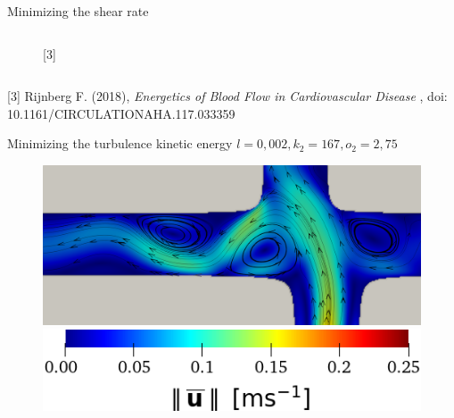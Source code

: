 \documentclass[aspectratio=169,xcolor=dvipsnames]{beamer}
\begin{document}
\begin{frame}{Minimizing the shear rate}
\begin{columns}
\begin{column}{.35\textwidth}
\begin{figure}
				\caption{[3]}		
			\end{figure}
		\end{column}
	\end{columns}	
	\vspace{-1mm}
	\tiny{[3] Rijnberg F. (2018), \textit{Energetics of Blood Flow in Cardiovascular
			Disease
		}, doi: 10.1161/CIRCULATIONAHA.117.033359}
\end{frame}
\begin{frame}{Minimizing the turbulence kinetic energy}
	$ l = 0{,}002, k_2 = 167, o_2 = 2{,}75$
	\begin{figure}[H]
		\centering
		\vspace{3mm}
		\includegraphics[width=0.75
		\textwidth]{Images/tcpc_tke_veloc_a3.png}\\[11pt]
		\includegraphics[width=0.37	\textwidth]{Images/tcpc_dotgamma_veloc_legenda.png}
	\end{figure}
\end{frame}
\end{document}
